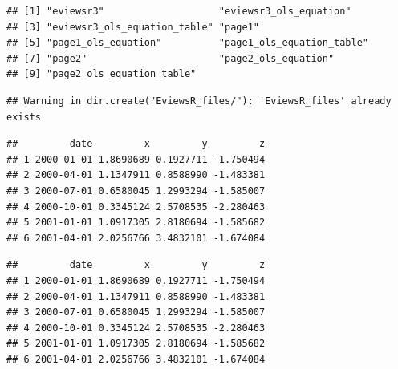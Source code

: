 \documentclass[
]{article}
\newenvironment{Shaded}{\begin{snugshade}}{\end{snugshade}}
\newcommand{\FunctionTok}[1]{\textcolor[rgb]{0.00,0.00,0.00}{#1}}
\newcommand{\NormalTok}[1]{#1}
\newcommand{\SpecialCharTok}[1]{\textcolor[rgb]{0.00,0.00,0.00}{#1}}
\begin{document}
\begin{verbatim}
## [1] "eviewsr3"                    "eviewsr3_ols_equation"      
## [3] "eviewsr3_ols_equation_table" "page1"                      
## [5] "page1_ols_equation"          "page1_ols_equation_table"   
## [7] "page2"                       "page2_ols_equation"         
## [9] "page2_ols_equation_table"
\end{verbatim}

\begin{verbatim}
## Warning in dir.create("EviewsR_files/"): 'EviewsR_files' already exists
\end{verbatim}

\begin{Shaded}
\end{Shaded}

\begin{verbatim}
##         date         x         y         z
## 1 2000-01-01 1.8690689 0.1927711 -1.750494
## 2 2000-04-01 1.1347911 0.8588990 -1.483381
## 3 2000-07-01 0.6580045 1.2993294 -1.585007
## 4 2000-10-01 0.3345124 2.5708535 -2.280463
## 5 2001-01-01 1.0917305 2.8180694 -1.585682
## 6 2001-04-01 2.0256766 3.4832101 -1.674084
\end{verbatim}

\begin{Shaded}
\end{Shaded}

\begin{verbatim}
##         date         x         y         z
## 1 2000-01-01 1.8690689 0.1927711 -1.750494
## 2 2000-04-01 1.1347911 0.8588990 -1.483381
## 3 2000-07-01 0.6580045 1.2993294 -1.585007
## 4 2000-10-01 0.3345124 2.5708535 -2.280463
## 5 2001-01-01 1.0917305 2.8180694 -1.585682
## 6 2001-04-01 2.0256766 3.4832101 -1.674084
\end{verbatim}

\begin{Shaded}
\end{Shaded}
\end{document}
